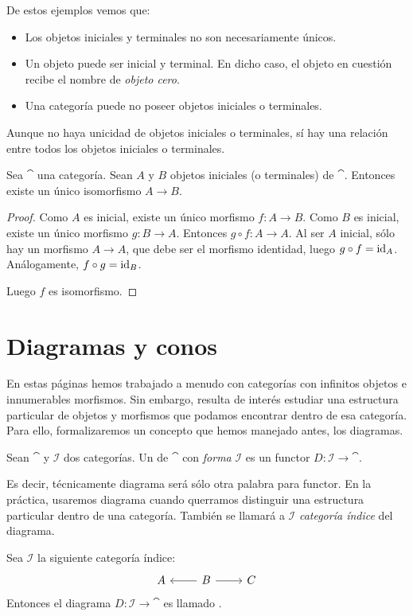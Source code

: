 De estos ejemplos vemos que:
\begin{itemize}
  \item Los objetos iniciales y terminales no son necesariamente únicos.
  \item Un objeto puede ser inicial y terminal.
  En dicho caso, el objeto en cuestión recibe el nombre de \emph{objeto cero}.
  \item Una categoría puede no poseer objetos iniciales o terminales.
\end{itemize}

Aunque no haya unicidad de objetos iniciales o terminales, sí hay una relación entre todos los objetos iniciales o terminales.
\begin{proposition}
Sea $\cat$ una categoría. Sean $A$ y $B$ objetos iniciales (o terminales) de $\cat$.
Entonces existe un único isomorfismo $A \to B$.
\end{proposition}
\begin{proof}
Como $A$ es inicial, existe un único morfismo $f \colon A \to B$.
Como $B$ es inicial, existe un único morfismo $g \colon B \to A$.
Entonces $g \circ f \colon A \to A$.
Al ser $A$ inicial, sólo hay un morfismo $A \to A$, que debe ser el morfismo identidad, luego $g \circ f = \operatorname{id}_A$.
Análogamente, $f \circ g = \operatorname{id}_B$.

Luego $f$ es isomorfismo.
\end{proof}

\section{Diagramas y conos}
En estas páginas hemos trabajado a menudo con categorías con infinitos objetos e innumerables morfismos.
Sin embargo, resulta de interés estudiar una estructura particular de objetos y morfismos que podamos encontrar dentro de esa categoría.
Para ello, formalizaremos un concepto que hemos manejado antes, los diagramas.
\begin{definition}
Sean $\cat$ y $\mathcal{I}$ dos categorías. Un  de $\cat$ con \emph{forma} $\mathcal{I}$ es un functor $D \colon \mathcal{I} \to \cat$.
\end{definition}
Es decir, técnicamente diagrama será sólo otra palabra para functor.
En la práctica, usaremos diagrama cuando querramos distinguir una estructura particular dentro de una categoría.
También se llamará a $\mathcal{I}$ \emph{categoría índice} del diagrama.

\begin{example}\label{ejemplo-span}
Sea $\mathcal{I}$ la siguiente categoría índice:
\[ \begin{tikzcd}
A & B \arrow[l] \arrow[r] & C
\end{tikzcd} \]
Entonces el diagrama $D \colon \mathcal{I} \to \cat$ es llamado .
\end{example}

